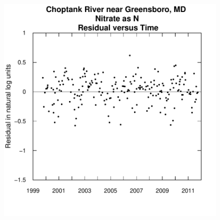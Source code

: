 \documentclass[a4paper,11pt]{article}
\begin{document}
\begin{figure}[htbp]
\begin{minipage}[h]{0.5\linewidth}
\begin{center}
\includegraphics{EGRET-figplotResidTime}
    \label{fig:plotResidTime}
    \end{center}
  \end{minipage}
  \caption{}
  \label{fig:plotResidQANDplotResidTime}
\end{figure}

\end{document}
